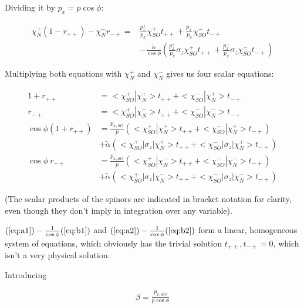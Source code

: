 \documentclass[11pt]{article}
\newcommand{\ta}{\tilde \alpha}
\begin{document}
Dividing it by  $p_x = p \cos \phi$: 

\begin{align}
    \chi_N^+ (1 - r_{++}) - \chi_N^- r_{-+}
        =& \frac{p_x^+}{p_x} \chi_{SO}^+ t_{++} + \frac{p_x^-}{p_x} \chi_{SO}^- t_{-+} \nonumber\\
         &   - \frac{\ta}{\cos \phi} \left( \frac{p_x^+}{p_x} \sigma_z \chi_{SO}^+
                 t_{++} + \frac{p_x^-}{p_x} \sigma_z \chi_{SO}^- t_{-+} \right)
\end{align}

Multiplying both equations with $\chi_N^+$ and $\chi_N^-$ gives us
four scalar equations:

\begin{align} 
    \label{eq:a1}
    1 + r_{++}  &= <\chi_{SO}^+|\chi_N^+> t_{++} +
                    <\chi_{SO}^-|\chi_N^+> t_{-+}\\
    \label{eq:a2}
        r_{-+}  &= <\chi_{SO}^+|\chi_N^-> t_{++} + <\chi_{SO}^-|\chi_N^-> t_{-+}\\
    \label{eq:b1}
    \cos \phi  (1 + r_{++})
                &= \frac{p_{x,SO}}{p} \left(<\chi_{SO}^+|\chi_N^+> t_{++} 
                        + <\chi_{SO}^-|\chi_N^+> t_{-+} \right) \nonumber \\
                &  + \ta \left(<\chi_{SO}^+|\sigma_z|\chi_N^+> t_{++} 
                        + <\chi_{SO}^-|\sigma_z|\chi_N^+> t_{-+} \right)\\
 \label{eq:b2}
    \cos \phi \  r_{-+}
                &= \frac{p_{x,SO}}{p} \left(<\chi_{SO}^+|\chi_N^-> t_{++} 
                        + <\chi_{SO}^-|\chi_N^-> t_{-+} \right) \nonumber\\
                &  + \ta \left(<\chi_{SO}^+|\sigma_z|\chi_N^-> t_{++} 
                        + <\chi_{SO}^-|\sigma_z|\chi_N^-> t_{-+} \right)
\end{align}

(The scalar products of the spinors are indicated in bracket notation
for clarity, even though they don't imply in integration over any
variable).

$(\ref{eq:a1}) - \frac{1}{\cos \phi} (\ref{eq:b1})$
and
$(\ref{eq:a2}) - \frac{1}{\cos \phi} (\ref{eq:b2})$ form a linear,
homogeneous system of equations, which obviously has the trivial
solution $t_{++}, t_{-+} = 0$, which isn't a very physical solution.

Introducing

\begin{align}
    \beta = \frac{p_{x,SO}}{p \cos \phi}
\end{align}
\end{document}

